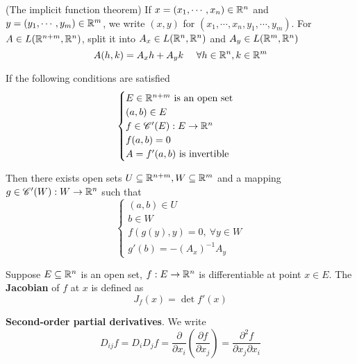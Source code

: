     \begin{theo}
        (The implicit function theorem)
        If $x = (x_1,\cdots,x_n) \in \mathbb{R}^n$ and $y = (y_1,\cdots,y_m) \in \mathbb{R}^m$, we write $(x,y)$ for $(x_1,\cdots,x_n,y_1,\cdots,y_m)$. For $A \in L(\mathbb{R}^{n+m}, \mathbb{R}^n)$, split it into $A_x \in L(\mathbb{R}^n, \mathbb{R}^n)$ and $A_y \in L(\mathbb{R}^m, \mathbb{R}^n)$
        \begin{equation}
            A(h,k) = A_x h + A_y k \ \ \ \ \forall h \in \mathbb{R}^n, k \in \mathbb{R}^m
        \end{equation}

        If the following conditions are satisfied
        \begin{equation*}
            \begin{cases}
                \text{$E \in \mathbb{R}^{n+m}$ is an open set} \\
                (a,b) \in E \\
                f \in \mathscr{C}'(E) : E \to \mathbb{R}^n \\
                f(a,b) = 0 \\
                A = f'(a,b) \text{ is invertible}
            \end{cases}
        \end{equation*}

        Then there exists open sets $U \subseteq \mathbb{R}^{n+m}, W \subseteq \mathbb{R}^{m}$ and a mapping $g \in \mathscr{C}'(W) : W \to \mathbb{R}^n$ such that
        \begin{equation*}
            \begin{cases}
                (a,b) \in U \\
                b \in W \\
                f(g(y),y) = 0, \ \forall y \in W \\
                g'(b) = -(A_x)^{-1} A_y
            \end{cases}
        \end{equation*} 
    \end{theo}

    \begin{defi}
        Suppose $E \subseteq \mathbb{R}^n$ is an open set, $f: E \to \mathbb{R}^n$ is differentiable at point $x \in E$. The \textbf{Jacobian} of $f$ at $x$ is defined as
        \begin{equation}
            J_f(x) = \det f'(x)
        \end{equation}
    \end{defi}

    \begin{defi}
        \textbf{Second-order partial derivatives}. We write
        \begin{equation}
            D_{ij}f = D_iD_jf = \frac{\partial}{\partial x_i} 
            \left(
                \frac{\partial f}{\partial x_j}
            \right)
            = \frac{\partial^2 f}{\partial x_j \partial x_i}
        \end{equation}
    \end{defi}

